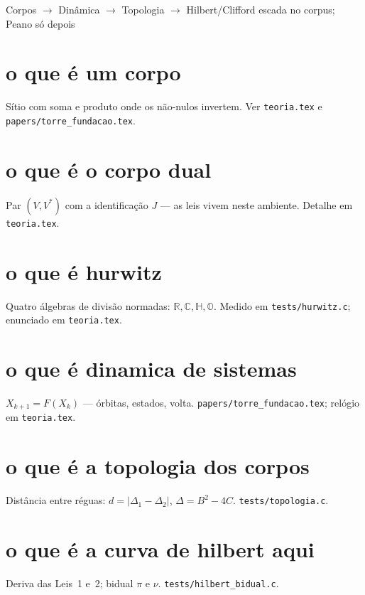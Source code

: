 \documentclass[11pt,a4paper]{article}
\newcommand{\code}[1]{\texttt{\small #1}}
\begin{document}
       {Corpos $\to$ Dinâmica $\to$ Topologia $\to$ Hilbert/Clifford}
       {escada no corpus; Peano só depois}
\maketitle
\begin{abstract}
Pares de fala sobre as quatro fundações, no tom da assistente.
Fontes: \code{teoria.tex}, \code{papers/torre\_fundacao.tex},
\code{tests/topologia.c}, \code{tests/hurwitz.c}, \code{tests/hilbert\_bidual.c}.
Semente: \code{tools/fundacao.sh}.
\end{abstract}

\section{o que é um corpo}
Sítio com soma e produto onde os não-nulos invertem.
Ver \code{teoria.tex} e \code{papers/torre\_fundacao.tex}.

\section{o que é o corpo dual}
Par $(V,V^{*})$ com a identificação $J$ --- as leis vivem neste ambiente.
Detalhe em \code{teoria.tex}.

\section{o que é hurwitz}
Quatro álgebras de divisão normadas: $\mathbb{R},\mathbb{C},\mathbb{H},\mathbb{O}$.
Medido em \code{tests/hurwitz.c}; enunciado em \code{teoria.tex}.

\section{o que é dinamica de sistemas}
$X_{k+1}=F(X_k)$ --- órbitas, estados, volta.
\code{papers/torre\_fundacao.tex}; relógio em \code{teoria.tex}.

\section{o que é a topologia dos corpos}
Distância entre réguas: $d=\lvert\Delta_1-\Delta_2\rvert$, $\Delta=B^{2}-4C$.
\code{tests/topologia.c}.

\section{o que é a curva de hilbert aqui}
Deriva das Leis~1 e~2; bidual $\pi$ e $\nu$.
\code{tests/hilbert\_bidual.c}.
\end{document}
